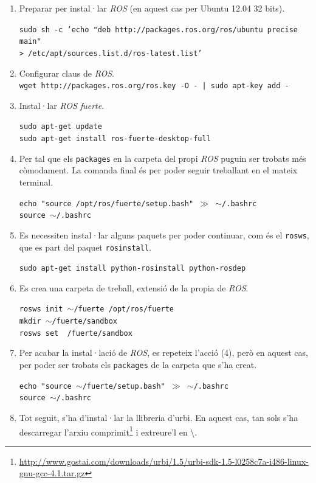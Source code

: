 \documentclass[12pt,a4paper,final,twoside]{article}
\begin{document}
\begin{enumerate}

\item Preparar per instal·lar \textit{ROS} (en aquest cas per Ubuntu 12.04 32 bits).

\texttt{sudo sh -c 'echo "deb http://packages.ros.org/ros/ubuntu precise main" \\> /etc/apt/sources.list.d/ros-latest.list'}

\item Configurar claus de \textit{ROS}.\\
\texttt{wget http://packages.ros.org/ros.key -O - | sudo apt-key add -}

\item Instal·lar \textit{ROS fuerte}.

\texttt{sudo apt-get update}\\
\texttt{sudo apt-get install ros-fuerte-desktop-full}

\item Per tal que els \texttt{packages} en la carpeta del propi \textit{ROS} puguin ser trobats més còmodament. La comanda final és per poder seguir treballant en el mateix terminal.

\texttt{echo "source /opt/ros/fuerte/setup.bash" $\gg$ $\sim$/.bashrc\\source $\sim$/.bashrc}

\item Es necessiten instal·lar alguns paquets per poder continuar, com és el \texttt{rosws}, que es part del paquet \texttt{rosinstall}.

\texttt{sudo apt-get install python-rosinstall python-rosdep}

\item Es crea una carpeta de treball, extensió de la propia de \textit{ROS}.

\texttt{rosws init $\sim$/fuerte /opt/ros/fuerte}\\
\texttt{mkdir $\sim$/fuerte/sandbox}\\
\texttt{rosws set ~/fuerte/sandbox}

\item Per acabar la instal·lació de \textit{ROS}, es repeteix l'acció (4), però en aquest cas, per poder ser trobats els \texttt{packages} de la carpeta que s'ha creat.

\texttt{echo "source $\sim$/fuerte/setup.bash" $\gg$ $\sim$/.bashrc\\source $\sim$/.bashrc}

\item Tot seguit, s'ha d'instal·lar la llibreria d'urbi. En aquest cas, tan sols s'ha descarregar l'arxiu comprimit\footnote{\url{http://www.gostai.com/downloads/urbi/1.5/urbi-sdk-1.5-l0258c7a-i486-linux-gnu-gcc-4.1.tar.gz}} i extreure'l en \textbackslash .



\end{enumerate}
\end{document}
